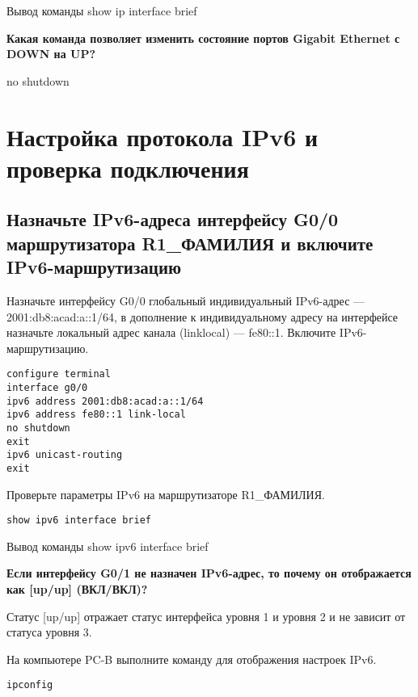 \begin{image}
	\caption{Вывод команды show ip interface brief}
\end{image}

\textbf{Какая команда позволяет изменить состояние
портов Gigabit Ethernet с DOWN на UP?}

no shutdown

\section{Настройка протокола IPv6 и проверка подключения}
\subsection{Назначьте IPv6-адреса интерфейсу G0/0 маршрутизатора R1\_ФАМИЛИЯ
и включите IPv6-маршрутизацию}

Назначьте интерфейсу G0/0 глобальный индивидуальный
IPv6-адрес --- 2001:db8:acad:a::1/64,
в дополнение к индивидуальному адресу на интерфейсе назначьте локальный адрес
канала (linklocal) --- fe80::1. Включите IPv6-маршрутизацию.

\begin{verbatim}
configure terminal
interface g0/0
ipv6 address 2001:db8:acad:a::1/64
ipv6 address fe80::1 link-local
no shutdown
exit
ipv6 unicast-routing
exit
\end{verbatim}

Проверьте параметры IPv6 на маршрутизаторе R1\_ФАМИЛИЯ.

\begin{verbatim}
show ipv6 interface brief
\end{verbatim}

\begin{image}
	\caption{Вывод команды show ipv6 interface brief}
\end{image}

\textbf{Если интерфейсу G0/1 не назначен IPv6-адрес,
то почему он отображается как [up/up] (ВКЛ/ВКЛ)?}

Статус [up/up] отражает статус интерфейса уровня 1 и уровня 2
и не зависит от статуса уровня 3.

На компьютере PC-B выполните команду для отображения настроек IPv6.

\begin{verbatim}
ipconfig
\end{verbatim}

